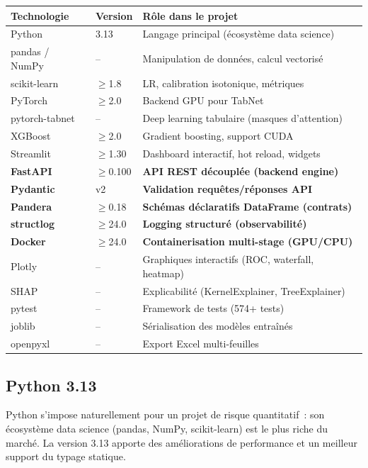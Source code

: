 \documentclass[12pt,a4paper]{article}
\begin{document}
\begin{center}
\begin{tabular}{llp{7cm}}
\toprule
\textbf{Technologie} & \textbf{Version} & \textbf{R\^ole dans le projet} \\
\midrule
Python & 3.13 & Langage principal (\'ecosyst\`eme data science) \\
pandas / NumPy & -- & Manipulation de donn\'ees, calcul vectoris\'e \\
scikit-learn & $\geq$1.8 & LR, calibration isotonique, m\'etriques \\
PyTorch & $\geq$2.0 & Backend GPU pour TabNet \\
pytorch-tabnet & -- & Deep learning tabulaire (masques d'attention) \\
XGBoost & $\geq$2.0 & Gradient boosting, support CUDA \\
Streamlit & $\geq$1.30 & Dashboard interactif, hot reload, widgets \\
\textbf{FastAPI} & $\geq$0.100 & \textbf{API REST d\'ecoupl\'ee (backend engine)} \\
\textbf{Pydantic} & v2 & \textbf{Validation requ\^etes/r\'eponses API} \\
\textbf{Pandera} & $\geq$0.18 & \textbf{Sch\'emas d\'eclaratifs DataFrame (contrats)} \\
\textbf{structlog} & $\geq$24.0 & \textbf{Logging structur\'e (observabilit\'e)} \\
\textbf{Docker} & $\geq$24.0 & \textbf{Containerisation multi-stage (GPU/CPU)} \\
Plotly & -- & Graphiques interactifs (ROC, waterfall, heatmap) \\
SHAP & -- & Explicabilit\'e (KernelExplainer, TreeExplainer) \\
pytest & -- & Framework de tests (574+ tests) \\
joblib & -- & S\'erialisation des mod\`eles entra\^in\'es \\
openpyxl & -- & Export Excel multi-feuilles \\
\bottomrule
\end{tabular}
\end{center}

\subsection{Python 3.13}

Python s'impose naturellement pour un projet de risque quantitatif~: son \'ecosyst\`eme data science (pandas, NumPy, scikit-learn) est le plus riche du march\'e. La version 3.13 apporte des am\'eliorations de performance et un meilleur support du typage statique.
\end{document}
